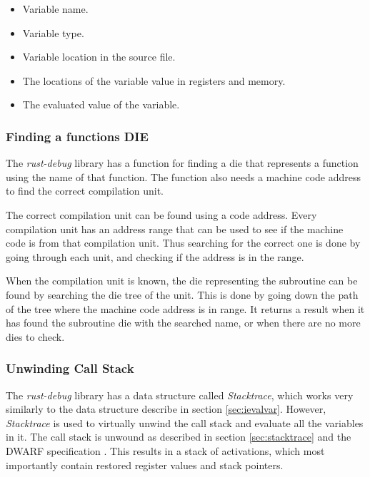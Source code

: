 \begin{itemize}
  \item Variable name.
  \item Variable type.
  \item Variable location in the source file.
  \item The locations of the variable value in registers and memory.
  \item The evaluated value of the variable.
\end{itemize}


\subsubsection{Finding a functions DIE} \label{sec:funcdie}
The \emph{rust-debug} library has a function for finding a \gls{die} that represents a function using the name of that function.
The function also needs a machine code address to find the correct compilation unit.


The correct compilation unit can be found using a code address.
Every compilation unit has an address range that can be used to see if the machine code is from that compilation unit.
Thus searching for the correct one is done by going through each unit, and checking if the address is in the range.


When the compilation unit is known, the \gls{die} representing the subroutine can be found by searching the \gls{die} tree of the unit.
This is done by going down the path of the tree where the machine code address is in range.
It returns a result when it has found the subroutine \gls{die} with the searched name, or when there are no more \glspl{die} to check.


\subsubsection{Unwinding Call Stack}
The \emph{rust-debug} library has a data structure called \emph{Stacktrace}, which works very similarly to the data structure describe in section \ref{sec:ievalvar}.
However, \emph{Stacktrace} is used to virtually unwind the call stack and evaluate all the variables in it.
The call stack is unwound as described in section \ref{sec:stacktrace} and the \gls{DWARF} specification \cite{dwarf}.
This results in a stack of activations, which most importantly contain restored register values and stack pointers.


